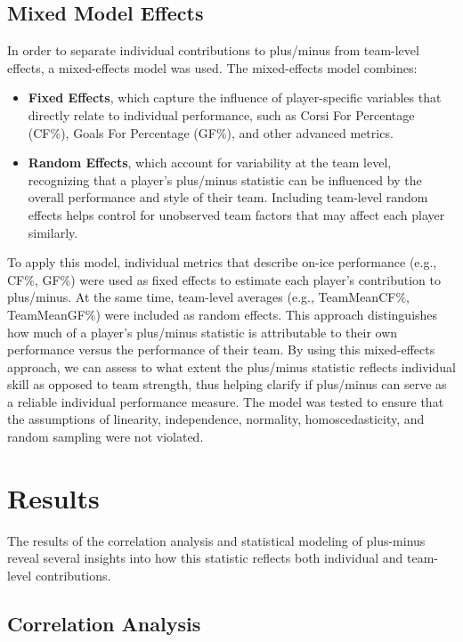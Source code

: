 \documentclass[12pt]{article}
\begin{document}
\subsection{Mixed Model Effects}

In order to separate individual contributions to plus/minus from team-level effects, a mixed-effects model was used. 
The mixed-effects model combines:
\begin{itemize}
    \item \textbf{Fixed Effects}, which capture the influence of player-specific variables that directly relate to individual performance, 
    such as Corsi For Percentage (CF\%), Goals For Percentage (GF\%), and other advanced metrics.
    \item \textbf{Random Effects}, which account for variability at the team level, recognizing that a player’s plus/minus statistic can be 
    influenced by the overall performance and style of their team. Including team-level random effects helps control for unobserved team 
    factors that may affect each player similarly.
\end{itemize}

To apply this model, individual metrics that describe on-ice performance (e.g., CF\%, GF\%) were used as fixed effects to estimate each player’s 
contribution to plus/minus. At the same time, team-level averages (e.g., TeamMeanCF\%, TeamMeanGF\%) were included as random effects. This 
approach distinguishes how much of a player's plus/minus statistic is attributable to their own performance versus the performance of their team.
By using this mixed-effects approach, we can assess to what extent the plus/minus statistic reflects individual skill as opposed to team 
strength, thus helping clarify if plus/minus can serve as a reliable individual performance measure. The model was tested to ensure that the
assumptions of linearity, independence, normality, homoscedasticity, and random sampling were not violated.


\section{Results}
\label{sec:resu}

The results of the correlation analysis and statistical modeling of plus-minus reveal several insights into how this statistic reflects 
both individual and team-level contributions.

\subsection{Correlation Analysis}
\end{document}

